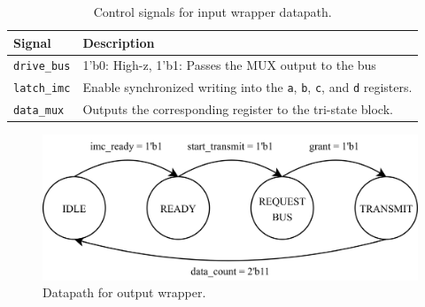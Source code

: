 \documentclass[../main.tex]{subfiles}
\begin{document}
\begin{table}[h]
    \centering
    \renewcommand{\arraystretch}{1.2}
    \setlength{\tabcolsep}{8pt}

    \begin{tabularx}{\textwidth}{@{}lX@{}}
        \toprule
        \textbf{Signal} & \textbf{Description} \\
        \midrule
        \texttt{drive\_bus} & 1'b0: High-z, \hspace{20pt} 1'b1: Passes the MUX output to the bus \\
        \texttt{latch\_imc} & Enable synchronized writing into the \texttt{a}, \texttt{b}, \texttt{c}, and \texttt{d} registers. \\
        \texttt{data\_mux}  & Outputs the corresponding register to the tri-state block. \\
        \bottomrule
    \end{tabularx}

    \caption{Control signals for input wrapper datapath.}
    \label{tab:q2_out_wrap_sig}
\end{table}

\newpage

\begin{figure}[h]
    \centering
    \includegraphics[width=0.8\linewidth]{assets/out_wrap_cont.png}
    \caption{Datapath for output wrapper.}
    \label{fig:q2_out_wrap_cont}
\end{figure}
\end{document}
